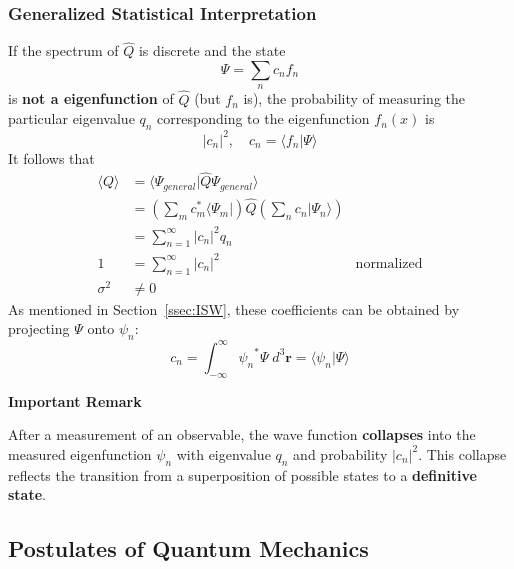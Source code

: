 \subsubsection{Generalized Statistical Interpretation}
If the spectrum of $\hat{Q}$ is discrete and the state
\begin{equation*}
    \Psi=\sum_n c_n f_n
\end{equation*}
is \textbf{not a eigenfunction} of $\hat{Q}$ (but $f_n$ is), the probability of measuring the particular eigenvalue $q_n$ corresponding to the eigenfunction $f_n(x)$ is
\noindent\begin{equation*}
    |c_n|^2, \quad c_n = \langle f_n|\Psi\rangle
\end{equation*}
It follows that
\noindent\begin{align*}
    \langle Q\rangle & = \langle\Psi_{general}|\hat{Q}\Psi_{general}\rangle                                                                 \\
                     & =\left(\sum_{m}c_{m}^{*}\langle\Psi_{m}|\right)\hat{Q}\left(\sum_{n}c_{n}|\Psi_{n}\rangle\right)                     \\
                     & = \sum_{n=1}^{\infty} |c_n|^2 q_n                                                                                    \\
    1                & =\sum_{n=1}^{\infty} |c_n|^2                                                                     & \text{normalized} \\
    \sigma^2         & \neq 0
\end{align*}
As mentioned in Section\ \ref{ssec:ISW}, these coefficients can be obtained by projecting $\Psi$ onto $\psi_n$:
\noindent\begin{equation*}
    c_n = \int_{-\infty}^{\infty} {\psi_n}^* \Psi\; d^3 \mathbf{r} = \langle \psi_n |\Psi \rangle
\end{equation*}

\textbf{Important Remark}

After a measurement of an observable, the wave function \textbf{collapses} into the measured eigenfunction $\psi_n$ with eigenvalue $q_n$ and probability $|c_n|^2$. This collapse reflects the transition from a superposition of possible states to a \textbf{definitive state}.

\subsection{Postulates of Quantum Mechanics}

